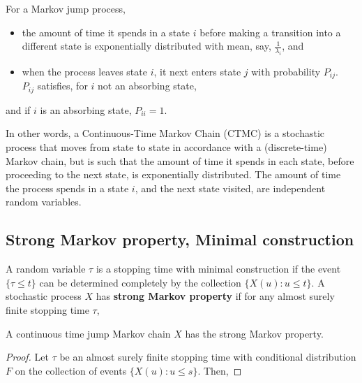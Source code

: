 \documentclass[all-lectures.tex]{subfiles}
\begin{document}
For a Markov jump process,
\begin{itemize}
\item the amount of time it spends in a state $i$ before making a transition into a different
state is exponentially distributed with mean, say, $\frac{1}{\lambda_i}$, and
\item when the process leaves state $i$, it next enters state $j$ with probability $P_{ij}$.
\\$P_{ij}$ satisfies, for $i$ not an absorbing state,
\end{itemize}
and if $i$ is an absorbing state, $P_{ii}=1$.

In other words, a Continuous-Time Markov Chain (CTMC) is a stochastic process that
moves from state to state in accordance with a (discrete-time) Markov chain, but is such that the amount of time it spends in each state, before proceeding to
the next state, is exponentially distributed. 
The amount of time the process spends in a state $i$, and the next state visited, are independent random variables.

\subsection{Strong Markov property, Minimal construction}

A random variable $\tau$ is a stopping time with minimal construction if the event $\{\tau \leq t\}$ can be determined completely by the collection $\{X(u): u \leqslant t\}$. 
A stochastic process $X$ has \textbf{strong Markov property} if for any almost surely finite stopping time $\tau$, 
\begin{lem}
	\label{Lemma:StrongMarkovProperty}
	A continuous time jump Markov chain $X$ has the strong Markov property. 
\end{lem}
\begin{proof}

	Let $\tau$ be an almost surely finite stopping time with conditional distribution $F$ on the collection of events $\{X(u): u \leq s\}$. 
	Then, 
\end{proof}
\end{document}
